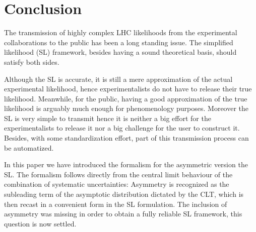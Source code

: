 \documentclass[11pt]{article}
\begin{document}
%


\section{Conclusion}


The transmission of highly complex LHC likelihoods 
from the experimental collaborations to the public
 has been a long standing issue.  The simplified likelihood (SL) framework, besides having a sound theoretical basis, should satisfy both sides.


Although the SL is  accurate, it is still a mere approximation of the actual experimental likelihood, hence experimentalists do not have to release their true likelihood. Meanwhile, for the public, having a good approximation of the true likelihood is arguably much enough for phenomenology purposes. 
Moreover the SL is very simple to transmit  hence it is neither a big effort for the experimentalists to release it nor a big challenge for the user to construct it.  Besides, with some standardization effort, part of this transmission process can be automatized. 

In this paper we have introduced the formalism for the asymmetric version the SL. 
The formalism follows directly from the central limit behaviour of the combination of systematic uncertainties: Asymmetry is recognized  as the subleading term of the asymptotic distribution dictated by the CLT, which is then recast in a convenient form in the SL formulation. 
The inclusion of asymmetry was missing in order to obtain a fully reliable SL framework, this question is now settled. 
\end{document}
